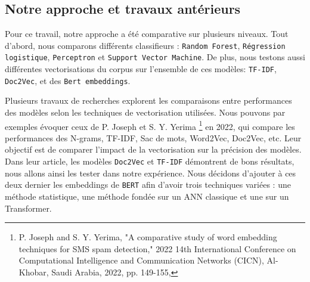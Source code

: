 \subsection{Notre approche et travaux antérieurs}

Pour ce travail, notre approche a été comparative sur plusieurs niveaux. Tout d'abord, nous comparons différents classifieurs : \texttt{Random Forest}, \texttt{Régression logistique}, \texttt{Perceptron} et \texttt{Support Vector Machine}. De plus, nous testons aussi différentes vectorisations du corpus sur l'ensemble de ces modèles: \texttt{TF-IDF}, \texttt{Doc2Vec}, et des \texttt{Bert embeddings}.


\par Plusieurs travaux de recherches explorent les comparaisons entre performances des modèles selon les techniques de vectorisation utilisées. Nous pouvons par exemples évoquer ceux de P. Joseph et S. Y. Yerima \footnote{P. Joseph and S. Y. Yerima, "A comparative study of word embedding techniques for SMS spam detection," 2022 14th International Conference on Computational Intelligence and Communication Networks (CICN), Al-Khobar, Saudi Arabia, 2022, pp. 149-155,} en 2022, qui compare les performances des N-grams, TF-IDF, Sac de mots, Word2Vec, Doc2Vec, etc. Leur objectif est de comparer l'impact de la vectorisation sur la précision des modèles. Dans leur article, les modèles \texttt{Doc2Vec} et \texttt{TF-IDF} démontrent de bons résultats, nous allons ainsi les tester dans notre expérience. Nous décidons d'ajouter à ces deux dernier les embeddings de \texttt{BERT} afin d'avoir trois techniques variées : une méthode statistique, une méthode fondée sur un ANN classique et une sur un Transformer.
